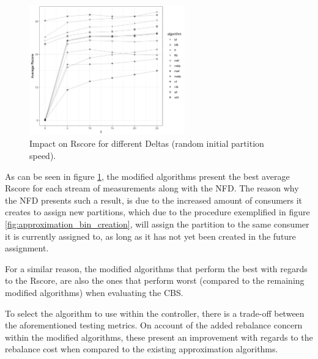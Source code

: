 \begin{figure}[htb!] 
    \centering
    \includegraphics[width=0.6\textwidth]{images/controller/Rscore.png}
    \caption{
        Impact on Rscore for different Deltas (random initial partition speed).
    } 
    \label{fig:rscore} 
\end{figure}

As can be seen in figure \ref{fig:rscore}, the modified algorithms present the
best average Rscore for each stream of measurements along with the NFD. The
reason why the NFD presents such a result, is due to the increased amount of
consumers it creates to assign new partitions, which due to the procedure
exemplified in figure \ref{fig:approximation_bin_creation}, will assign the
partition to the same consumer it is currently assigned to, as long as it has
not yet been created in the future assignment.

For a similar reason, the modified algorithms that perform the best with regards
to the Rscore, are also the ones that perform worst (compared to the remaining
modified algorithms) when evaluating the CBS.

To select the algorithm to use within the controller, there is a trade-off
between the aforementioned testing metrics. On account of the added rebalance
concern within the modified algorithms, these present an improvement with
regards to the rebalance cost when compared to the existing approximation
algorithms.

